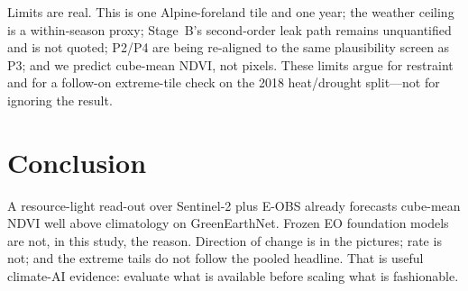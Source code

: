 \documentclass[10pt,twocolumn]{article}
\begin{document}
Limits are real. This is one Alpine-foreland tile and one year; the weather
ceiling is a within-season proxy; Stage~B's second-order leak path remains
unquantified and is not quoted; P2/P4 are being re-aligned to the same
plausibility screen as P3; and we predict cube-mean NDVI, not pixels. These
limits argue for restraint and for a follow-on extreme-tile check on the 2018
heat/drought split---not for ignoring the result.

\section{Conclusion}
A resource-light read-out over Sentinel-2 plus E-OBS already forecasts
cube-mean NDVI well above climatology on GreenEarthNet. Frozen EO foundation
models are not, in this study, the reason. Direction of change is in the
pictures; rate is not; and the extreme tails do not follow the pooled headline.
That is useful climate-AI evidence: evaluate what is available before scaling
what is fashionable.




\clearpage
\appendix

\end{document}
